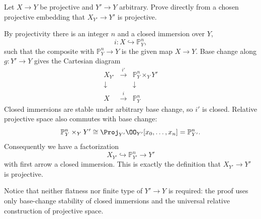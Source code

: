 \begin{problem}\label{prob:vi38-05}
Let \(X\to Y\) be projective and \(Y'\to Y\) arbitrary.  Prove directly from a chosen projective embedding that \(X_{Y'}\to Y'\) is projective.
\end{problem}

\ifdefined\FullProblemDossiers
\begin{solution}
By projectivity there is an integer \(n\) and a closed immersion over \(Y\),
\[
i:X\hookrightarrow\mathbb P^n_Y,
\]
such that the composite with \(\mathbb P^n_Y\to Y\) is the given map \(X\to Y\).
Base change along \(g:Y'\to Y\) gives the Cartesian diagram
\[
\begin{array}{ccc}
X_{Y'} & \xrightarrow{\ i'\ } & \mathbb P^n_Y\times_Y Y'\\
\downarrow && \downarrow\\
X & \xrightarrow{\ i\ } & \mathbb P^n_Y
\end{array}
\]
Closed immersions are stable under arbitrary base change, so \(i'\) is closed.
Relative projective space also commutes with base change:
\[
\mathbb P^n_Y\times_Y Y'
\cong
\Proj_{Y'}\OO_{Y'}[x_0,\ldots,x_n]
=
\mathbb P^n_{Y'}.
\]
Consequently we have a factorization
\[
\boxed{X_{Y'}\hookrightarrow\mathbb P^n_{Y'}\longrightarrow Y'}
\]
with first arrow a closed immersion.  This is exactly the definition that
\(X_{Y'}\to Y'\) is projective.

Notice that neither flatness nor finite type of \(Y'\to Y\) is required: the proof
uses only base-change stability of closed immersions and the universal relative
construction of projective space.
\end{solution}
\fi
